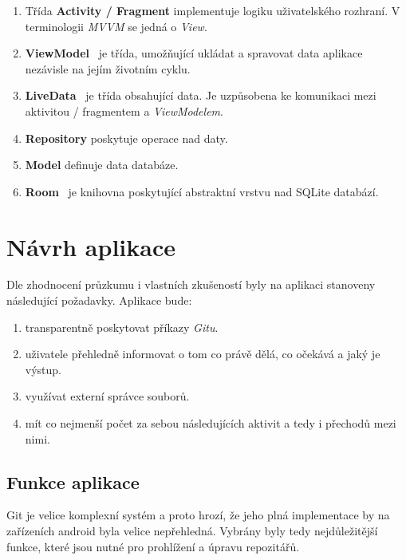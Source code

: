         \begin{enumerate}
            \item Třída \textbf{Activity / Fragment} implementuje logiku uživatelského rozhraní. V terminologii \emph{MVVM} se jedná o \emph{View}.
            \item \textbf{ViewModel}~ je třída, umožňující ukládat a spravovat data aplikace nezávisle na jejím životním cyklu.
            \item \textbf{LiveData}~ je třída obsahující data. Je uzpůsobena ke komunikaci mezi aktivitou / fragmentem a \emph{ViewModelem}.
            \item \textbf{Repository} poskytuje operace nad daty.
            \item \textbf{Model} definuje data databáze.
            \item \textbf{Room}~ je knihovna poskytující abstraktní vrstvu nad SQLite databází.
        \end{enumerate}
        


\chapter{Návrh aplikace}
Dle zhodnocení průzkumu i vlastních zkušeností byly na aplikaci stanoveny následující požadavky. Aplikace bude:
\begin{enumerate}
    \item transparentně poskytovat příkazy \emph{Gitu}.
    \item uživatele přehledně informovat o tom co právě dělá, co očekává a jaký je výstup.
    \item využívat externí správce souborů.
    \item mít co nejmenší počet za sebou následujících aktivit a tedy i přechodů mezi nimi.
\end{enumerate}

\section{Funkce aplikace}
Git je velice komplexní systém a proto hrozí, že jeho plná implementace by na zařízeních android byla velice nepřehledná. Vybrány byly tedy nejdůležitější funkce, které jsou nutné pro prohlížení a úpravu repozitářů. 


